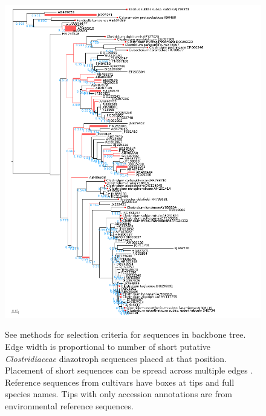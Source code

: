 \begin{figure}[H]
  \centering
  \caption{See methods for selection criteria for sequences in backbone tree. Edge width is proportional to number of short putative \textit{Clostridiaceae} diazotroph sequences placed at that position. Placement of short sequences can be spread across multiple edges \cite{Matsen_2010}. Reference sequences from cultivars have boxes at tips and full species names. Tips with only accession annotations are from environmental reference sequences.}
    \includegraphics[width=1.0\textwidth]{figures/clost.tree/clost_tree.png}
  \label{fig:clost_tree}
\end{figure}

